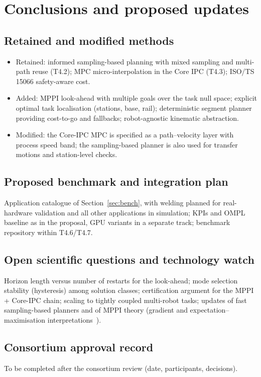 \documentclass{plan4ari_report}
\begin{document}
\section{Conclusions and proposed updates}\label{sec:conclusions}

\subsection{Retained and modified methods}
\begin{itemize}
\item Retained: informed sampling-based planning with mixed sampling and multi-path reuse (T4.2); MPC micro-interpolation in the Core IPC (T4.3); ISO/TS 15066 safety-aware cost.
\item Added: MPPI look-ahead with multiple goals over the task null space; explicit optimal task localisation (stations, base, rail); deterministic segment planner providing cost-to-go and fallbacks; robot-agnostic kinematic abstraction.
\item Modified: the Core-IPC MPC is specified as a path--velocity layer with process speed band; the sampling-based planner is also used for transfer motions and station-level checks.
\end{itemize}

\subsection{Proposed benchmark and integration plan}
Application catalogue of Section~\ref{sec:bench}, with welding planned for real-hardware validation and all other applications in simulation; KPIs and OMPL baseline as in the proposal, GPU variants in a separate track; benchmark repository within T4.6/T4.7.

\subsection{Open scientific questions and technology watch}
Horizon length versus number of restarts for the look-ahead; mode selection stability (hysteresis) among solution classes; certification argument for the MPPI + Core-IPC chain; scaling to tightly coupled multi-robot tasks; updates of fast sampling-based planners and of MPPI theory (gradient and expectation--maximisation interpretations~\cite{fazlyab2026mppigd,wang2026mppiem}).

\subsection{Consortium approval record}
\begin{planbox}
To be completed after the consortium review (date, participants, decisions).
\end{planbox}

\clearpage


\end{document}
